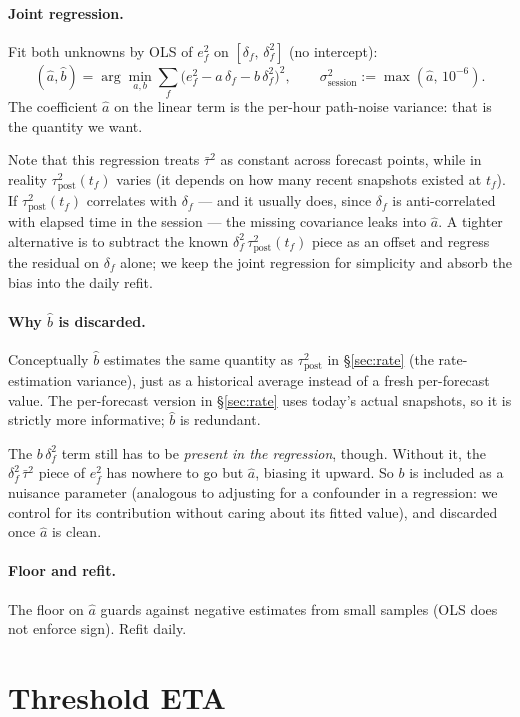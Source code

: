 \documentclass[11pt]{article}
\newcommand{\taupostsq}{\tau_{\text{post}}^2}
\newcommand{\sigsessionsq}{\sigma_{\text{session}}^2}
\begin{document}
\paragraph{Joint regression.} Fit both unknowns by OLS of $e_f^2$ on
$[\delta_f,\, \delta_f^2]$ (no intercept):
\[
  (\hat a, \hat b)
    = \arg\min_{a, b} \sum_f \bigl(e_f^2 - a\,\delta_f - b\,\delta_f^2\bigr)^2,
  \qquad
  \sigsessionsq := \max(\hat a,\, 10^{-6}).
\]
The coefficient $\hat a$ on the linear term is the per-hour path-noise
variance: that is the quantity we want.

Note that this regression treats $\bar\tau^2$ as constant across forecast
points, while in reality $\taupostsq(t_f)$ varies (it depends on how many
recent snapshots existed at $t_f$). If $\taupostsq(t_f)$ correlates with
$\delta_f$ --- and it usually does, since $\delta_f$ is anti-correlated with
elapsed time in the session --- the missing covariance leaks into $\hat a$.
A tighter alternative is to subtract the known $\delta_f^2\,\taupostsq(t_f)$
piece as an offset and regress the residual on $\delta_f$ alone; we keep
the joint regression for simplicity and absorb the bias into the daily
refit.

\paragraph{Why $\hat b$ is discarded.} Conceptually $\hat b$ estimates the
same quantity as $\taupostsq$ in \S\ref{sec:rate} (the rate-estimation
variance), just as a historical average instead of a fresh per-forecast
value. The per-forecast version in \S\ref{sec:rate} uses today's actual
snapshots, so it is strictly more informative; $\hat b$ is redundant.

The $b\,\delta_f^2$ term still has to be \emph{present in the regression},
though. Without it, the $\delta_f^2\,\bar\tau^2$ piece of $e_f^2$ has
nowhere to go but $\hat a$, biasing it upward. So $b$ is included as a
nuisance parameter (analogous to adjusting for a confounder in a
regression: we control for its contribution without caring about its fitted
value), and discarded once $\hat a$ is clean.

\paragraph{Floor and refit.} The floor on $\hat a$ guards against negative
estimates from small samples (OLS does not enforce sign). Refit daily.

\section{Threshold ETA}
\end{document}
